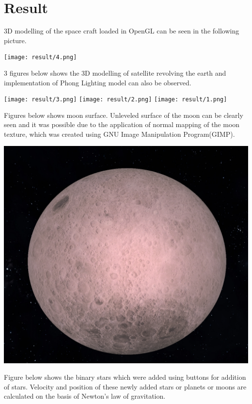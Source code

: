 \documentclass[12pt]{article}
\begin{document}
\clearpage

\section{Result}

3D modelling of the space craft loaded in OpenGL can be seen in the following picture. 

\begin{center}
	\texttt{[image: result/4.png]}
\end{center}

3 figures below shows the 3D modelling of satellite revolving the earth and implementation of Phong Lighting model can also be observed.
\begin{center}
	\texttt{[image: result/3.png]}
	\texttt{[image: result/2.png]}
	\texttt{[image: result/1.png]}
\end{center}

Figures below shows moon surface. Unleveled surface of the moon can be clearly seen and it was possible due to the application of normal mapping of the moon texture, which was created using GNU Image Manipulation Program(GIMP).

\begin{center}
	\includegraphics[scale=0.35]{result/moon.png}
\end{center}

\clearpage

Figure below shows the binary stars which were added using buttons for addition of stars. Velocity and position of these newly added stars or planets or moons are calculated on the basis of Newton's law of gravitation.
\end{document}
